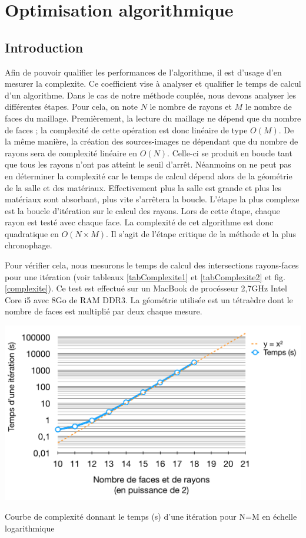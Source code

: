 \chapter{Optimisation algorithmique}
	\minitoc
	\newpage
	
\section*{Introduction} \label{complexite}

Afin de pouvoir qualifier les performances de l'algorithme, il est d'usage d'en mesurer la \gls{complexite}. Ce coefficient vise à analyser et qualifier le temps de calcul d'un algorithme. Dans le cas de notre méthode couplée, nous devons analyser les différentes étapes. Pour cela, on note $N$ le nombre de rayons et $M$ le nombre de faces du maillage. Premièrement, la lecture du maillage ne dépend que du nombre de faces ; la complexité de cette opération est donc linéaire de type $O(M)$. De la même manière, la création des sources-images ne dépendant que du nombre de rayons sera de complexité linéaire en $O(N)$. Celle-ci se produit en boucle tant que tous les rayons n'ont pas atteint le seuil d'arrêt. Néanmoins on ne peut pas en déterminer la  complexité car le temps de calcul dépend alors de la géométrie de la salle et des matériaux. Effectivement plus la salle est grande et plus les matériaux sont absorbant, plus vite s'arrêtera la boucle. L'étape la plus complexe est la boucle d'itération sur le calcul des rayons. Lors de cette étape, chaque rayon est testé avec chaque face. La complexité de cet algorithme est donc quadratique en $O(N \times M)$. Il s'agit de l'étape critique de la méthode et la plus chronophage.

Pour vérifier cela, nous mesurons le temps de calcul des intersections rayons-faces pour une itération (voir tableaux \ref{tabComplexite1} et \ref{tabComplexite2} et fig. \ref{complexite}). Ce test est effectué sur un MacBook de procésseur 2,7GHz Intel Core i5 avec 8Go de RAM DDR3. La géométrie utilisée est un tétraèdre dont le nombre de faces est multiplié par deux chaque mesure.


 \begin{figureth}
	\includegraphics[width=0.8\linewidth]{images/complexite00}
	\caption{Courbe de complexité donnant le temps (s) d'une itération pour N=M en échelle logarithmique}
	\label{complexite00}
\end{figureth}

